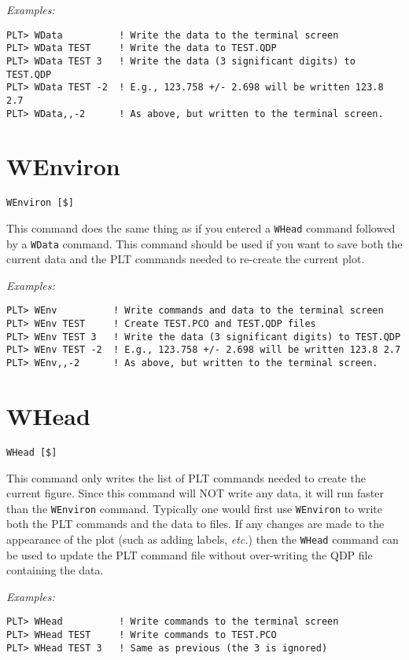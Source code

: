 \medskip\noindent
{\em Examples:}
\begin{verbatim}
PLT> WData          ! Write the data to the terminal screen
PLT> WData TEST     ! Write the data to TEST.QDP
PLT> WData TEST 3   ! Write the data (3 significant digits) to TEST.QDP
PLT> WData TEST -2  ! E.g., 123.758 +/- 2.698 will be written 123.8 2.7
PLT> WData,,-2      ! As above, but written to the terminal screen.
\end{verbatim}

\section*{WEnviron}
\begin{verbatim}
WEnviron [$]
\end{verbatim}
   This command does the same thing as if you entered a {\tt WHead} command
followed by a {\tt WData} command.  This command should be used if you
want to save both the current data and the PLT commands needed to
re-create the current plot.

\medskip\noindent
{\em Examples:}
\begin{verbatim}
PLT> WEnv          ! Write commands and data to the terminal screen
PLT> WEnv TEST     ! Create TEST.PCO and TEST.QDP files
PLT> WEnv TEST 3   ! Write the data (3 significant digits) to TEST.QDP
PLT> WEnv TEST -2  ! E.g., 123.758 +/- 2.698 will be written 123.8 2.7
PLT> WEnv,,-2      ! As above, but written to the terminal screen.
\end{verbatim}

\section*{WHead}
\begin{verbatim}
WHead [$]
\end{verbatim}
   This command only writes the list of PLT commands needed to create
the current figure.  Since this command will NOT write any data, it
will run faster than the {\tt WEnviron} command.  Typically one would
first use {\tt WEnviron} to write both the PLT commands and the data to
files.  If any changes are made to the appearance of the plot
(such as adding labels, {\it etc.}) then the {\tt WHead} command can be used
to update the PLT command file without over-writing the QDP file
containing the data.

\medskip\noindent
{\em Examples:}
\begin{verbatim}
PLT> WHead          ! Write commands to the terminal screen
PLT> WHead TEST     ! Write commands to TEST.PCO
PLT> WHead TEST 3   ! Same as previous (the 3 is ignored)
\end{verbatim}

